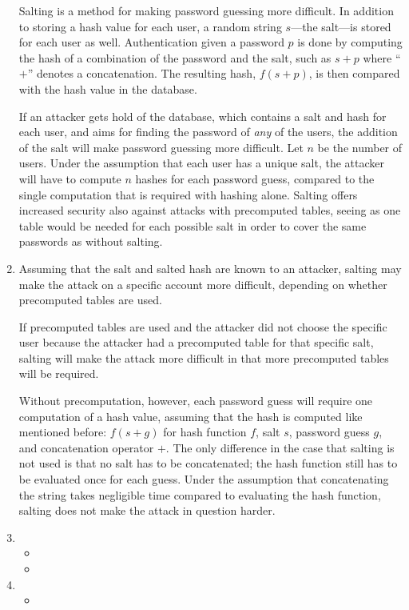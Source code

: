 \begin{enumerate}
Salting is a method for making password guessing more difficult. In addition to storing a hash value for each user, a random string $s$---the salt---is stored for each user as well. Authentication given a password $p$ is done by computing the hash of a combination of the password and the salt, such as $s + p$ where ``$+$'' denotes a concatenation. The resulting hash, $f(s + p)$, is then compared with the hash value in the database.

If an attacker gets hold of the database, which contains a salt and hash for each user, and aims for finding the password of \emph{any} of the users, the addition of the salt will make password guessing more difficult. Let $n$ be the number of users. Under the assumption that each user has a unique salt, the attacker will have to compute $n$ hashes for each password guess, compared to the single computation that is required with hashing alone\cite{book:salting}. Salting offers increased security also against attacks with precomputed tables, seeing as one table would be needed for each possible salt in order to cover the same passwords as without salting.
\item %

Assuming that the salt and salted hash are known to an attacker, salting may make the attack on a specific account more difficult, depending on whether precomputed tables are used.

If precomputed tables are used and the attacker did not choose the specific user because the attacker had a precomputed table for that specific salt, salting will make the attack more difficult in that more precomputed tables will be required.

Without precomputation, however, each password guess will require one computation of a hash value, assuming that the hash is computed like mentioned before: $f(s + g)$ for hash function $f$, salt $s$, password guess $g$, and concatenation operator $+$. The only difference in the case that salting is not used is that no salt has to be concatenated; the hash function still has to be evaluated once for each guess. Under the assumption that concatenating the string takes negligible time compared to evaluating the hash function, salting does not make the attack in question harder.
\item \highergradesonly
  \begin{itemize}
    \item
    \item
  \end{itemize}
\item %
  \begin{itemize}
    \item


\end{itemize}
\end{enumerate}
